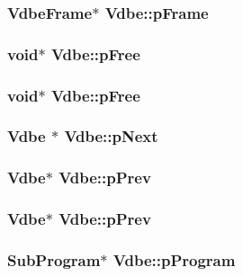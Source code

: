 \subsubsection{\setlength{\rightskip}{0pt plus 5cm}\bf{Vdbe\-Frame}$\ast$ \bf{Vdbe::p\-Frame}}\label{structVdbe_638706edb365f926e4c5b3d08ea65389}


\subsubsection{\setlength{\rightskip}{0pt plus 5cm}void$\ast$ \bf{Vdbe::p\-Free}}\label{structVdbe_eb3661ca67c50a10b49f0dd900444873}


\subsubsection{\setlength{\rightskip}{0pt plus 5cm}void$\ast$ \bf{Vdbe::p\-Free}}\label{structVdbe_eb3661ca67c50a10b49f0dd900444873}


\subsubsection{\setlength{\rightskip}{0pt plus 5cm}\bf{Vdbe} $\ast$ \bf{Vdbe::p\-Next}}\label{structVdbe_84365f81cd7c0bdf5059ca89ee244419}


\subsubsection{\setlength{\rightskip}{0pt plus 5cm}\bf{Vdbe}$\ast$ \bf{Vdbe::p\-Prev}}\label{structVdbe_0f109774fe1bf5ca6cd50214b71fc415}


\subsubsection{\setlength{\rightskip}{0pt plus 5cm}\bf{Vdbe}$\ast$ \bf{Vdbe::p\-Prev}}\label{structVdbe_0f109774fe1bf5ca6cd50214b71fc415}


\subsubsection{\setlength{\rightskip}{0pt plus 5cm}\bf{Sub\-Program}$\ast$ \bf{Vdbe::p\-Program}}\label{structVdbe_392bb8adc6e72d87dea31b93f9539456}


